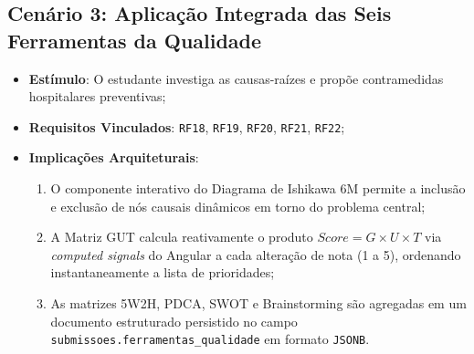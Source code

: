 \subsection{Cenário 3: Aplicação Integrada das Seis Ferramentas da Qualidade}
\label{subsec_cenario_qualidade}
\begin{itemize}
    \item \textbf{Estímulo}: O estudante investiga as causas-raízes e propõe contramedidas hospitalares preventivas;
    \item \textbf{Requisitos Vinculados}: \texttt{RF18}, \texttt{RF19}, \texttt{RF20}, \texttt{RF21}, \texttt{RF22};
    \item \textbf{Implicações Arquiteturais}:
    \begin{enumerate}
        \item O componente interativo do Diagrama de Ishikawa 6M permite a inclusão e exclusão de nós causais dinâmicos em torno do problema central;
        \item A Matriz GUT calcula reativamente o produto $Score = G \times U \times T$ via \textit{computed signals} do Angular a cada alteração de nota (1 a 5), ordenando instantaneamente a lista de prioridades;
        \item As matrizes 5W2H, PDCA, SWOT e Brainstorming são agregadas em um documento estruturado persistido no campo \texttt{submissoes.ferramentas\_qualidade} em formato \texttt{JSONB}.
    \end{enumerate}
\end{itemize}

